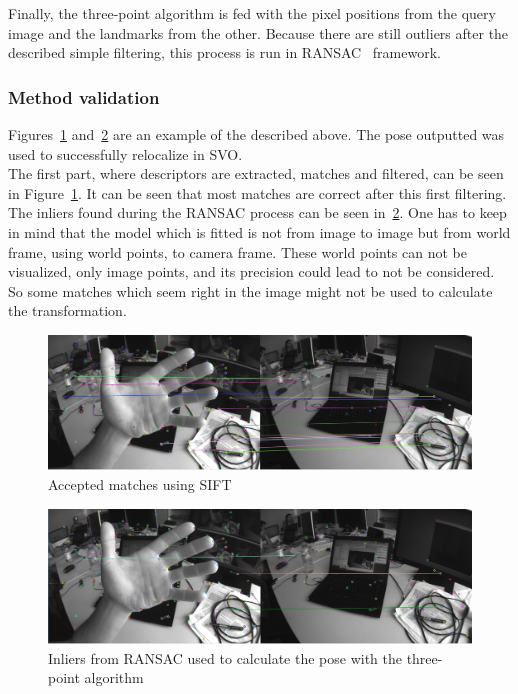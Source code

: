 Finally, the three-point algorithm is fed with the pixel positions from the query image and the landmarks from the other. Because there are still outliers after the described simple filtering, this process is run in RANSAC~\cite{fischler1981random} framework. \\


\subsubsection{Method validation}
\label{ssub:3pt_method_validation}

Figures~\ref{fig:3pt_matches} and~\ref{fig:3pt_inliers} are an example of the described above. The pose outputted was used to successfully relocalize in SVO.\\

The first part, where descriptors are extracted, matches and filtered, can be seen in Figure~\ref{fig:3pt_matches}.  It can be seen that most matches are correct after this first filtering.\\

The inliers found during the RANSAC process can be seen in~\ref{fig:3pt_inliers}. One has to keep in mind that the model which is fitted  is not from image to image but from world frame, using world points, to camera frame. These world points can not be visualized, only image points, and its precision could lead to not be considered. So some matches which seem right in the image might not be used to calculate the transformation.\\

\begin{figure}[htpb]
  \centering
  \includegraphics[width=1.0\linewidth]{img/3pt_matches_1.png}
  \caption{Accepted matches using SIFT}
  \label{fig:3pt_matches}
\end{figure}


\begin{figure}[htpb]
  \centering
  \includegraphics[width=1.0\linewidth]{img/3pt_inliers_1.png}
  \caption{Inliers from RANSAC used to calculate the pose with the three-point algorithm }
  \label{fig:3pt_inliers}
\end{figure}


